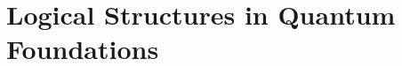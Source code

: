 \documentclass{scrartcl}
\DeclareMathOperator{\tp}{tp}
\begin{document}

\section{Logical Structures in Quantum Foundations}
\end{document}
